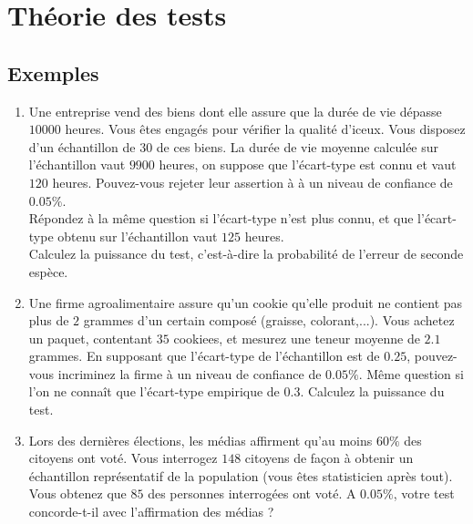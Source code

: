 \section{Théorie des tests}

\subsection{Exemples}
\begin{enumerate}
\item Une entreprise vend des biens dont elle assure que la durée de vie dépasse $10000$ heures. Vous êtes engagés pour vérifier la qualité d'iceux. Vous disposez d'un échantillon de $30$ de ces biens. La durée de vie moyenne calculée sur l'échantillon vaut $9900$ heures, on suppose que l'écart-type est connu et vaut $120$ heures. Pouvez-vous rejeter leur assertion à à un niveau de confiance de $0.05\%$.\\
Répondez à la même question si l'écart-type n'est plus connu, et que l'écart-type obtenu sur l'échantillon vaut $125$ heures.\\
Calculez la puissance du test, c'est-à-dire la probabilité de l'erreur de seconde espèce.

\item Une firme agroalimentaire assure qu'un cookie qu'elle produit ne contient pas plus de $2$ grammes d'un certain composé (graisse, colorant,...). Vous achetez un paquet, contentant $35$ cookiees, et mesurez une teneur moyenne de $2.1$ grammes. En supposant que l'écart-type de l'échantillon est de $0.25$, pouvez-vous incriminez la firme à un niveau de confiance de $0.05\%$. Même question si l'on ne connaît que l'écart-type empirique de $0.3$. Calculez la puissance du test.

\item Lors des dernières élections, les médias affirment qu'au moins $60\%$ des citoyens ont voté. Vous interrogez $148$ citoyens de façon à obtenir un échantillon représentatif de la population (vous êtes statisticien après tout). Vous obtenez que $85$ des personnes interrogées ont voté. A $0.05\%$, votre test concorde-t-il  avec l'affirmation des médias ?
\end{enumerate}
